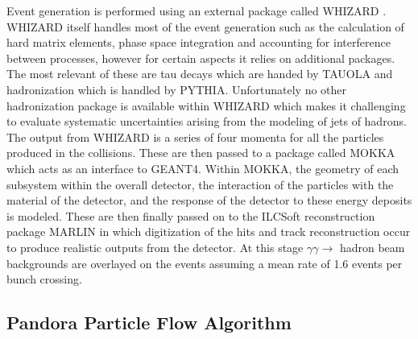 Event generation is performed using an external package called WHIZARD \cite{Kilian:2007gr}. WHIZARD itself handles most of the event generation such as the calculation of hard matrix elements, phase space integration and accounting for interference between processes, however for certain aspects it relies on additional packages. The most relevant of these are tau decays which are handed by TAUOLA\cite{Jadach:1990mz} and hadronization which is handled by PYTHIA\cite{Sjostrand:2006za}. Unfortunately no other hadronization package is available within WHIZARD which makes it challenging to evaluate systematic uncertainties arising from the modeling of jets of hadrons. The output from WHIZARD is a series of four momenta for all the particles produced in the collisions. These are then passed to a package called MOKKA which acts as an interface to GEANT4\cite{MoradeFreitas:2002kj}. Within MOKKA, the geometry of each subsystem within the overall detector, the interaction of the particles with the material of the detector, and the response of the detector to these energy deposits is modeled. These are then finally passed on to the ILCSoft reconstruction package MARLIN in which digitization of the hits and track reconstruction occur to produce realistic outputs from the detector. At this stage $\gamma\gamma\rightarrow$ hadron beam backgrounds are overlayed on the events assuming a mean rate of 1.6 events per bunch crossing.


\subsection{Pandora Particle Flow Algorithm}
\label{Pandora}

